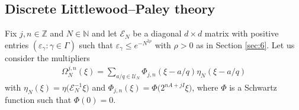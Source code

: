 \documentclass[a4paper,oneside]{amsart}
\theoremstyle{plain}
\theoremstyle{definition}
\numberwithin{equation}{section}
\theoremstyle{plain}
\newcommand{\ZZ}{\mathbb{Z}}
\newcommand{\NN}{\mathbb{N}}
\newcommand{\8}{\infty}
\begin{document}
\subsection{Discrete Littlewood--Paley theory}
Fix $j, n\in\ZZ$ and $N\in\NN$ and let $\mathcal
E_N$ be a diagonal $d\times d$ matrix with positive entries
$(\varepsilon_{\gamma}: \gamma\in\Gamma)$ such that
$\varepsilon_{\gamma} \le e^{-N^{2\rho}}$ with $\rho>0$ as in Section \ref{sec:6}. Let us consider the multipliers 
\begin{align}
  \label{eq:9}
  \Omega_{N}^{j, n}(\xi)=\sum_{a/q\in\mathscr U_{N}}\Phi_{j,
    n}(\xi-a/q)\eta_N(\xi-a/q)
\end{align}
with $\eta_N(\xi)=\eta\big(\mathcal E_N^{-1}\xi\big)$ and  $\Phi_{j,
  n}(\xi)=\Phi\big(2^{nA+jI}\xi\big)$, where $\Phi$
is  a Schwartz function such that $\Phi(0)=0$.
  
\end{document}
